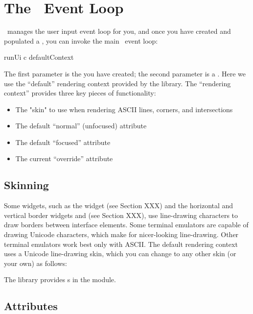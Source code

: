 \section{The \vtyui\ Event Loop}
\label{sec:event_loop}

\vtyui\ manages the user input event loop for you, and once you have
created and populated a , you can invoke the main
\vtyui\ event loop:

\begin{haskellcode}
 runUi c defaultContext
\end{haskellcode}

The first parameter is the  you have created; the
second parameter is a .  Here we use the ``default''
rendering context provided by the library.  The ``rendering context''
provides three key pieces of functionality:

\begin{itemize}
\item The "skin" to use when rendering ASCII lines, corners, and
      intersections
\item The default ``normal'' (unfocused) attribute
\item The default ``focused'' attribute
\item The current ``override'' attribute
\end{itemize}

\subsection{Skinning}

Some widgets, such as the  widget (see Section XXX) and the
horizontal and vertical border widgets  and 
(see Section XXX), use line-drawing characters to draw borders between
interface elements.  Some terminal emulators are capable of drawing
Unicode characters, which make for nicer-looking line-drawing.  Other
terminal emulators work best only with ASCII.  The default rendering
context uses a Unicode line-drawing skin, which you can change to any
other skin (or your own) as follows:


The library provides s in the  module.

\subsection{Attributes}
\label{sec:attributes}

